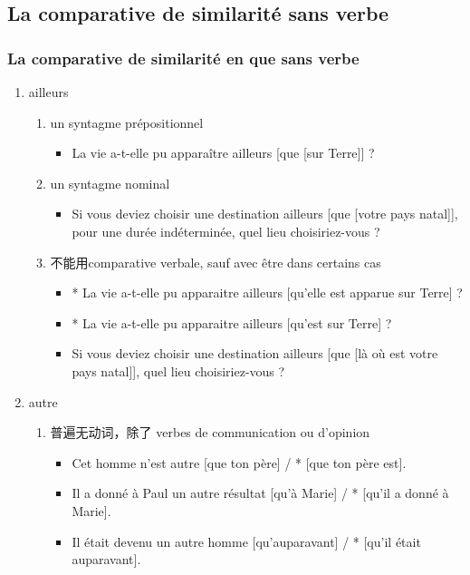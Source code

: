 \documentclass[UTF8]{report}
\begin{document}
\subsection{La comparative de similarité sans verbe}
\subsubsection{La comparative de similarité en que sans verbe}
\begin{enumerate}
    \item ailleurs
    \begin{enumerate}
        \item un syntagme prépositionnel
        \begin{itemize}
            \item La vie a-t-elle pu apparaître ailleurs [que [sur Terre]] ?
        \end{itemize}
        \item un syntagme nominal
        \begin{itemize}
            \item Si vous deviez choisir une destination ailleurs [que [votre pays natal]], pour une durée indéterminée, quel lieu choisiriez-vous ? 
        \end{itemize}
        \item 不能用comparative verbale, sauf avec être dans certains cas
        \begin{itemize}
            \item * La vie a-t-elle pu apparaitre ailleurs [qu’elle est apparue sur Terre] ?
            \item * La vie a-t-elle pu apparaitre ailleurs [qu’est sur Terre] ?
            \item Si vous deviez choisir une destination ailleurs [que [là où est votre pays natal]], quel lieu choisiriez-vous ?
        \end{itemize}
    \end{enumerate}
    \item autre
    \begin{enumerate}
        \item 普遍无动词，除了 verbes de communication ou d’opinion
        \begin{itemize}
            \item Cet homme n’est autre [que ton père] / * [que ton père est].
            \item Il a donné à Paul un autre résultat [qu’à Marie] / * [qu’il a donné à Marie].
            \item Il était devenu un autre homme [qu’auparavant] / * [qu’il était auparavant].

\end{itemize}
\end{enumerate}
\end{enumerate}
\end{document}
